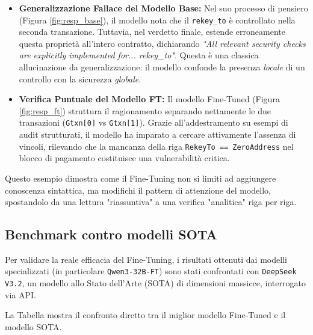 \begin{itemize}
    \item \textbf{Generalizzazione Fallace del Modello Base:} Nel suo processo di pensiero (Figura \ref{fig:resp_base}), il modello nota che il \texttt{rekey\_to} è controllato nella seconda transazione. Tuttavia, nel verdetto finale, estende erroneamente questa proprietà all'intero contratto, dichiarando \textit{"All relevant security checks are explicitly implemented for... rekey\_to"}. Questa è una classica allucinazione da generalizzazione: il modello confonde la presenza \textit{locale} di un controllo con la sicurezza \textit{globale}.
    
    \item \textbf{Verifica Puntuale del Modello FT:} Il modello Fine-Tuned (Figura \ref{fig:resp_ft}) struttura il ragionamento separando nettamente le due transazioni (\texttt{Gtxn[0]} vs \texttt{Gtxn[1]}). Grazie all'addestramento su esempi di audit strutturati, il modello ha imparato a cercare attivamente l'assenza di vincoli, rilevando che la mancanza della riga \texttt{RekeyTo == ZeroAddress} nel blocco di pagamento costituisce una vulnerabilità critica.
\end{itemize}

Questo esempio dimostra come il Fine-Tuning non si limiti ad aggiungere conoscenza sintattica, ma modifichi il pattern di attenzione del modello, spostandolo da una lettura "riassuntiva" a una verifica "analitica" riga per riga.

\newpage

\subsection{Benchmark contro modelli SOTA}
\label{sec:benchmark_deepseek}

Per validare la reale efficacia del Fine-Tuning, i risultati ottenuti dai modelli specializzati (in particolare \texttt{Qwen3-32B-FT}) sono stati confrontati con \texttt{DeepSeek V3.2}, un modello allo Stato dell'Arte (SOTA) di dimensioni massicce, interrogato via API.

La Tabella mostra il confronto diretto tra il miglior modello Fine-Tuned e il modello SOTA.

\begin{table}[ht]
\centering
{}
\label{tab:rere}
\caption{Confronto tra il modello Fine-Tuned (Specialist) e DeepSeek V3.2 (Generalist).}
\end{table}


